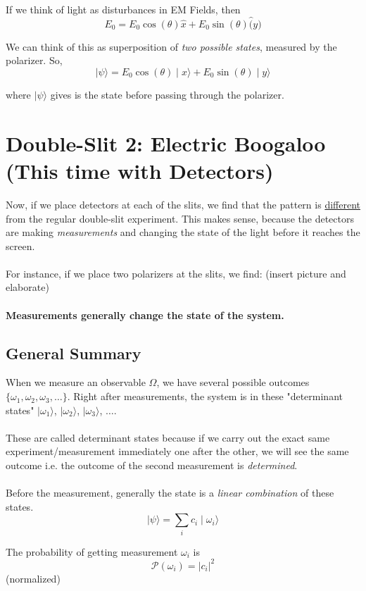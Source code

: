 \documentclass[twoside]{article}
\begin{document}
If we think of light as disturbances in EM Fields, then 
\[ E_0 = E_0 \cos(\theta) \hat{x} + E_0 \sin(\theta) \hat(y) \]

We can think of this as superposition of \emph{two possible states}, measured by the polarizer. So,
\[ \mid \psi \rangle = E_0 \cos(\theta) \mid x \rangle + E_0 \sin(\theta) \mid y \rangle \]

where $\mid \psi \rangle$ gives is the state before passing through the polarizer.

\section{Double-Slit 2: Electric Boogaloo (This time with Detectors)}
Now, if we place detectors at each of the slits, we find that the pattern is \underline{different} from the regular double-slit experiment. This makes sense, because the detectors are making \emph{measurements} and changing the state of the light before it reaches the screen.
\\
\\
For instance, if we place two polarizers at the slits, we find: (insert picture and elaborate)
\\
\\
\textbf{Measurements generally change the state of the system.}

\subsection*{General Summary}
When we measure an observable $\Omega$, we have several possible outcomes $\{ \omega_1, \omega_2, \omega_3, \dots \}$. Right after measurements, the system is in these "determinant states"  $\mid \omega_1 \rangle$, $\mid \omega_2 \rangle$, $\mid \omega_3 \rangle$, $\dots$.
\\
\\
These are called determinant states because if we carry out the exact same experiment/measurement immediately one after the other, we will see the same outcome i.e. the outcome of the second measurement is \emph{determined}.
\\
\\
Before the measurement, generally the state is a \emph{linear combination} of these states.
\[ \mid \psi \rangle = \sum_{i}  c_i  \mid \omega_i \rangle \]

The probability of getting measurement $\omega_i$ is 
\[ \mathcal{P}(\omega_i) = |c_i|^2 \]  (normalized)
\end{document}
